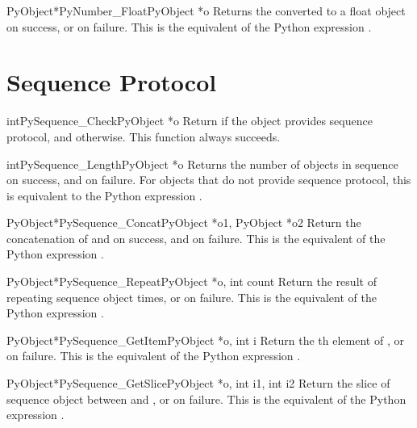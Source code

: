 \documentclass{manual}
\begin{document}
\begin{cfuncdesc}{PyObject*}{PyNumber_Float}{PyObject *o}
Returns the  converted to a float object on success, or
\NULL{} on failure.  This is the equivalent of the Python expression
.
\end{cfuncdesc}


\section{Sequence Protocol \label{sequence}}

\begin{cfuncdesc}{int}{PySequence_Check}{PyObject *o}
Return  if the object provides sequence protocol, and
 otherwise.  This function always succeeds.
\end{cfuncdesc}

\begin{cfuncdesc}{int}{PySequence_Length}{PyObject *o}
Returns the number of objects in sequence  on success, and
 on failure.  For objects that do not provide sequence
protocol, this is equivalent to the Python expression
.
\end{cfuncdesc}

\begin{cfuncdesc}{PyObject*}{PySequence_Concat}{PyObject *o1, PyObject *o2}
Return the concatenation of  and  on success, and \NULL{} on
failure.   This is the equivalent of the Python
expression .
\end{cfuncdesc}


\begin{cfuncdesc}{PyObject*}{PySequence_Repeat}{PyObject *o, int count}
Return the result of repeating sequence object
  times, or \NULL{} on failure.  This is the
equivalent of the Python expression .
\end{cfuncdesc}


\begin{cfuncdesc}{PyObject*}{PySequence_GetItem}{PyObject *o, int i}
Return the th element of , or \NULL{} on failure. This
is the equivalent of the Python expression .
\end{cfuncdesc}


\begin{cfuncdesc}{PyObject*}{PySequence_GetSlice}{PyObject *o, int i1, int i2}
Return the slice of sequence object  between  and
, or \NULL{} on failure. This is the equivalent of the Python
expression .
\end{cfuncdesc}
\end{document}
